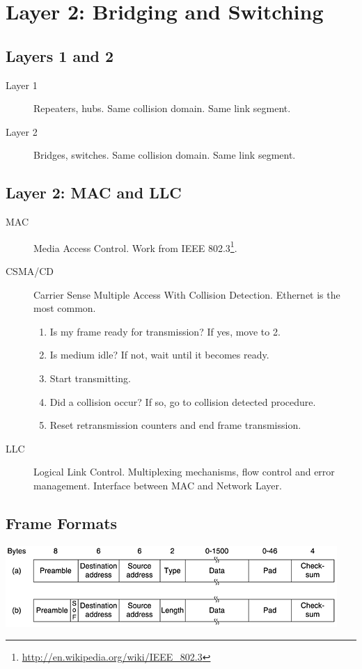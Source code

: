 \documentclass{article}
\begin{document}
\section{Layer 2: Bridging and Switching}

\subsection{Layers 1 and 2}

\begin{description}
	\item[Layer 1] Repeaters, hubs. Same collision domain. Same link segment.
	\item[Layer 2] Bridges, switches. Same collision domain. Same link segment.
\end{description}
	
	
\subsection{Layer 2: MAC and LLC}

\begin{description}
	\item[MAC] Media Access Control. Work from IEEE 802.3\footnote{\url{http://en.wikipedia.org/wiki/IEEE_802.3}}.
	\item[CSMA/CD] Carrier Sense Multiple Access With Collision Detection. Ethernet is the most common.
	\begin{enumerate}
    	\item Is my frame ready for transmission? If yes, move to 2.
    	\item Is medium idle? If not, wait until it becomes ready.
    	\item Start transmitting.
    	\item Did a collision occur? If so, go to collision detected procedure.
    	\item Reset retransmission counters and end frame transmission.
	\end{enumerate}
	\item[LLC] Logical Link Control. Multiplexing mechanisms, flow control and error management. Interface between MAC and Network Layer.
\end{description}
	
\subsection{Frame Formats}

\centerline{\includegraphics[scale=0.7]{images/Ethernet.png}\\[1cm]}
\end{document}
